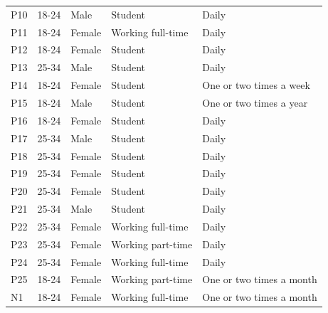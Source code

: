 \begin{table}[t]
\begin{tabular}{@{}p{2.5cm} p{2cm} p{2.5cm} p{4cm} p{4cm}@{}}
P10             & 18-24        & Male                    & Student                      & Daily                       \\
P11             & 18-24        & Female                  & Working full-time             & Daily                       \\
P12             & 18-24        & Female                  & Student                      & Daily                       \\
P13             & 25-34        & Male                    & Student                      & Daily                       \\
P14             & 18-24        & Female                  & Student                      & One or two times a week     \\
P15             & 18-24        & Male                    & Student                      & One or two times a year     \\
P16             & 18-24        & Female                  & Student                      & Daily                       \\
P17             & 25-34        & Male                    & Student                      & Daily                       \\
P18             & 25-34        & Female                  & Student                      & Daily                       \\
P19             & 25-34        & Female                  & Student                      & Daily                       \\
P20             & 25-34        & Female                  & Student                      & Daily                       \\
P21             & 25-34        & Male                    & Student                      & Daily                       \\
P22             & 25-34        & Female                  & Working full-time             & Daily                       \\
P23             & 25-34        & Female                  & Working part-time             & Daily                       \\
P24             & 25-34        & Female                  & Working full-time             & Daily                       \\
P25             & 18-24        & Female                  & Working part-time             & One or two times a month    \\
N1              & 18-24        & Female                  & Working full-time             & One or two times a month    \\

\end{tabular}
\end{table}
